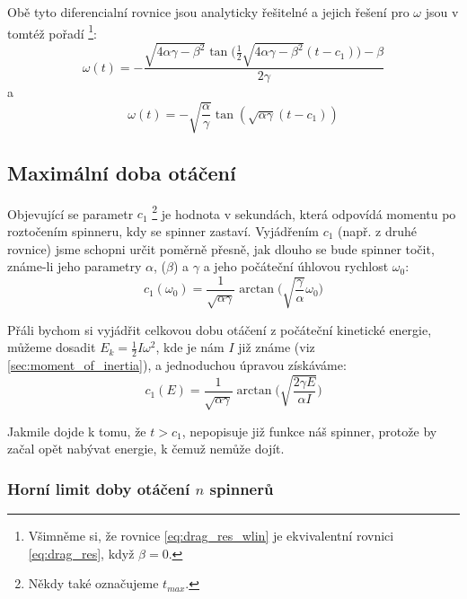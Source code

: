 \documentclass[12pt, a4paper,
 twoside,        %
 openright
]{report}
\begin{document}
Obě tyto diferencialní rovnice jsou analyticky řešitelné a jejich řešení pro $\omega$ jsou v tomtéž pořadí \footnote{Všimněme si, že rovnice \ref{eq:drag_res_wlin} je ekvivalentní rovnici \ref{eq:drag_res}, když $\beta = 0$.}:
\begin{equation}
    \label{eq:drag_res_wlin}
    \omega(t) = -\frac{\sqrt{4\alpha\gamma - \beta^2} \tan{(\frac{1}{2}\sqrt{4\alpha\gamma - \beta^2}(t-c_1)})-\beta}{2\gamma}
\end{equation}
a
\begin{equation}
    \label{eq:drag_res}
    \omega(t) = -\sqrt{\frac{\alpha}{\gamma}} \tan{(\sqrt{\alpha\gamma}(t-c_1))}
\end{equation}

\subsection{Maximální doba otáčení}

Objevující se parametr $c_1$ \footnote{Někdy také označujeme $t_{max}$.} je hodnota v sekundách, která odpovídá momentu po roztočením spinneru, kdy se spinner zastaví. Vyjádřením $c_1$ (např. z druhé rovnice) jsme schopni určit poměrně přesně, jak dlouho se bude spinner točit, známe-li jeho parametry $\alpha$, ($\beta$) a $\gamma$ a jeho počáteční úhlovou rychlost $\omega_0$:
\begin{equation}
    \label{eq:runtime_from_omeg0}
    c_1(\omega_0) = \frac{1}{\sqrt{\alpha\gamma}} \arctan{ \bigg( \sqrt{\frac{\gamma}{\alpha}} \omega_0 \bigg)}
\end{equation}

Přáli bychom si vyjádřit celkovou dobu otáčení z počáteční kinetické energie, můžeme dosadit $E_k = \frac{1}{2}I\omega^2$, kde je nám $I$ již známe (viz \ref{sec:moment_of_inertia}), a jednoduchou úpravou získáváme:
\begin{equation}
    \label{eq:runtime_from_ene}
    c_1(E) = \frac{1}{\sqrt{\alpha\gamma}} \arctan{ \bigg( \sqrt{\frac{2 \gamma E}{\alpha I}} \bigg)}
\end{equation}

Jakmile dojde k tomu, že $t > c_1$, nepopisuje již funkce náš spinner, protože by začal opět nabývat energie, k čemuž nemůže dojít.

\clearpage

\subsubsection{Horní limit doby otáčení $n$ spinnerů}
\end{document}

